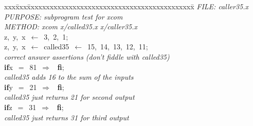 \documentclass{report}
\begin{document}
\pagestyle{empty}
\begin{tabbing}
xxx\=xxx\=xxxxxxxxxxxxxxxxxxxxxxxxxxxxxxxxxxxxxxxxxxxx\=\kill
{\tt{}}{\em{} FILE:    caller35.x
}\\
{\tt{}}{\em{} PURPOSE: subprogram test for xcom
}\\
{\tt{}}{\em{} METHOD:  xcom x/called35.x x/caller35.x
}\\
z,\ y,\ x\ $\leftarrow$\ 3,\ 2,\ 1;\>\>\\
z,\ y,\ x\ $\leftarrow$\ called35\ $\leftarrow$\ 15,\ 14,\ 13,\ 12,\ 11;\\
{\tt{}}{\em{} correct answer assertions (don't fiddle with called35)
}\\
{\bf if}\>x\ $=$\ 81\ $\Rightarrow$
\ {\bf {f}{i}};
\\
{\tt{}}{\em{} called35 adds 16 to the sum of the inputs
}\\
{\bf if}\>y\ $=$\ 21\ $\Rightarrow$
\ {\bf {f}{i}};
\\
{\tt{}}{\em{} called35 just returns 21 for second output
}\\
{\bf if}\>z\ $=$\ 31\ $\Rightarrow$
\ {\bf {f}{i}};
\\
{\tt{}}{\em{} called35 just returns 31 for third output
}\\
\end{tabbing}
\end{document}
